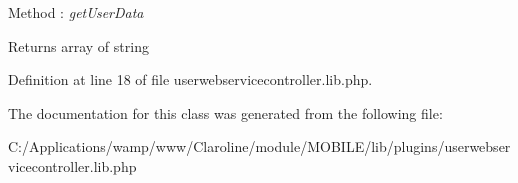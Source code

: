 \begin{DoxyPre}        Method : {\itshape getUserData\/}\end{DoxyPre}


\begin{DoxyReturn}{Returns}
array of string 
\end{DoxyReturn}


Definition at line 18 of file userwebservicecontroller.lib.php.



The documentation for this class was generated from the following file:\begin{DoxyCompactItemize}
\item 
C:/Applications/wamp/www/Claroline/module/MOBILE/lib/plugins/userwebservicecontroller.lib.php\end{DoxyCompactItemize}
